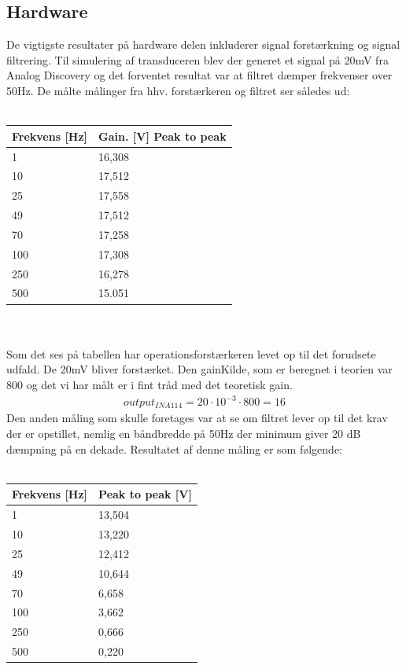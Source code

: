 \subsection{Hardware}
De vigtigste resultater på hardware delen inkluderer signal forstærkning og signal filtrering. Til simulering af transduceren blev der generet et signal på 20mV fra Analog Discovery og det forventet resultat var at filtret dæmper frekvenser over 50Hz. De målte målinger fra hhv. forstærkeren og filtret ser således ud: \\\\
\begin{tabular}{| l | l |} \hline
\textbf{Frekvens [Hz]} & \textbf{Gain. [V] Peak to peak}\\\hline
1 & 16,308 \\\hline 
10 & 17,512 \\\hline
25 & 17,558 \\\hline 
49 & 17,512\\\hline
70 & 17,258\\\hline 
100 & 17,308 \\\hline
250 & 16,278\\\hline
500 & 15.051\\\hline
\end{tabular}\\\\
Som det ses på tabellen har operationsforstærkeren levet op til det forudsete udfald. De 20mV bliver forstærket. Den gainKilde, som er beregnet i teorien var 800 og det vi har målt er i fint tråd med det teoretisk gain. 
\begin{align}
output_{INA114}=20\cdot 10^{-3}\cdot 800=16
\end{align}
Den anden måling som skulle foretages var at se om filtret lever op til det krav der er opstillet, nemlig en båndbredde på 50Hz der minimum giver 20 dB dæmpning på en dekade. Resultatet af denne måling er som følgende:  \\\\
\begin{tabular}{| l | l |} \hline
\textbf{Frekvens [Hz]} & \textbf{Peak to peak [V]}\\\hline
1 & 13,504 \\\hline 
10 & 13,220 \\\hline
25 & 12,412 \\\hline 
49 & 10,644\\\hline
70 & 6,658 \\\hline 
100 & 3,662 \\\hline
250 & 0,666\\\hline
500 & 0,220\\\hline
\end{tabular}\\\\
